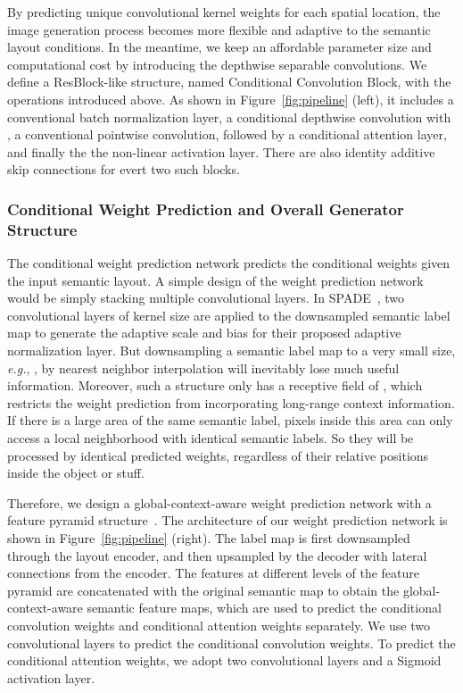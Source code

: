 \documentclass{article}
\newcommand{\eg}{\textit{e.g.}}
\begin{document}
By predicting unique convolutional kernel weights for each spatial location, the image generation process becomes more flexible and adaptive to the semantic layout conditions.
In the meantime, we keep an affordable parameter size and computational cost by introducing the depthwise separable convolutions.
We define a ResBlock-like structure, named Conditional Convolution Block, with the operations introduced above. 
As shown in Figure~\ref{fig:pipeline} (left), it includes a conventional batch normalization layer, a conditional depthwise convolution with , a conventional pointwise convolution, followed by a conditional attention layer, and finally the the non-linear activation layer. There are also identity additive skip connections for evert two such blocks. 






\subsubsection{Conditional Weight Prediction and Overall Generator Structure}
The conditional weight prediction network predicts the conditional weights  given the input semantic layout.
A simple design of the weight prediction network would be simply stacking multiple convolutional layers.
In SPADE~\cite{park2019semantic}, two convolutional layers of kernel size  are applied to the downsampled semantic label map to generate the adaptive scale and bias for their proposed adaptive normalization layer.
But downsampling a semantic label map to a very small size, \eg, , by nearest neighbor interpolation will inevitably lose much useful information.
Moreover, such a structure only has a receptive field of , which restricts the weight prediction from incorporating long-range context information.
If there is a large area of the same semantic label, pixels inside this area can only access a  local neighborhood with identical semantic labels.
So they will be processed by identical predicted weights, regardless of their relative positions inside the object or stuff.

Therefore, we design a global-context-aware weight prediction network with a feature pyramid structure~\cite{lin2017feature}.
The architecture of our weight prediction network is shown in Figure~\ref{fig:pipeline} (right).
The label map is first downsampled through the layout encoder, and then upsampled by the decoder with lateral connections from the encoder.
The features at different levels of the feature pyramid are concatenated with the original semantic map to obtain the global-context-aware semantic feature maps, which are used to predict the conditional convolution weights and conditional attention weights separately.
We use two convolutional layers to predict the conditional convolution weights.
To predict the conditional attention weights, we adopt two convolutional layers and a Sigmoid activation layer.
\end{document}
